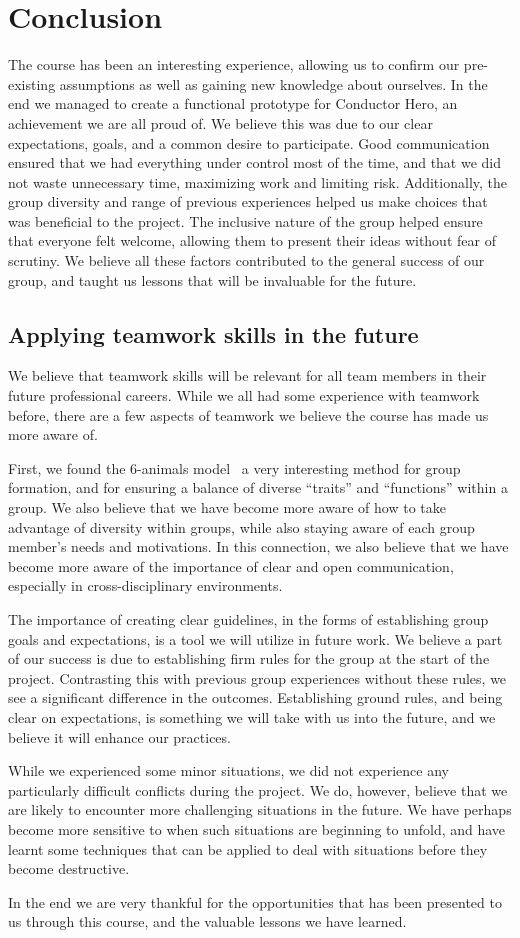 \chapter{Conclusion}
The course has been an interesting experience, allowing us to confirm our pre-existing assumptions as well as gaining new knowledge about ourselves. In the end we managed to create a functional prototype for Conductor Hero, an achievement we are all proud of. We believe this was due to our clear expectations, goals, and a common desire to participate. Good communication ensured that we had everything under control most of the time, and that we did not waste unnecessary time, maximizing work and limiting risk. Additionally, the group diversity and range of previous experiences helped us make choices that was beneficial to the project. The inclusive nature of the group helped ensure that everyone felt welcome, allowing them to present their ideas without fear of scrutiny. We believe all these factors contributed to the general success of our group, and taught us lessons that will be invaluable for the future.

\section{Applying teamwork skills in the future}
We believe that teamwork skills will be relevant for all team members in their future professional careers. While we all had some experience with teamwork before, there are a few aspects of teamwork we believe the course has made us more aware of.

First, we found the 6-animals model~\cite{six_animal_model} a very interesting method for group formation, and for ensuring a balance of diverse “traits” and “functions” within a group. We also believe that we have become more aware of how to take advantage of diversity within groups, while also staying aware of each group member’s needs and motivations. In this connection, we also believe that we have become more aware of the importance of clear and open communication, especially in cross-disciplinary environments. 

The importance of creating clear guidelines, in the forms of establishing group goals and expectations, is a tool we will utilize in future work. We believe a part of our success is due to establishing firm rules for the group at the start of the project. Contrasting this with previous group experiences without these rules, we see a significant difference in the outcomes. Establishing ground rules, and being clear on expectations, is something we will take with us into the future, and we believe it will enhance our practices.

While we experienced some minor situations, we did not experience any particularly difficult conflicts during the project. We do, however, believe that we are likely to encounter more challenging situations in the future. We have perhaps become more sensitive to when such situations are beginning to unfold, and have learnt some techniques that can be applied to deal with situations before they become destructive. 

In the end we are very thankful for the opportunities that has been presented to us through this course, and the valuable lessons we have learned.
